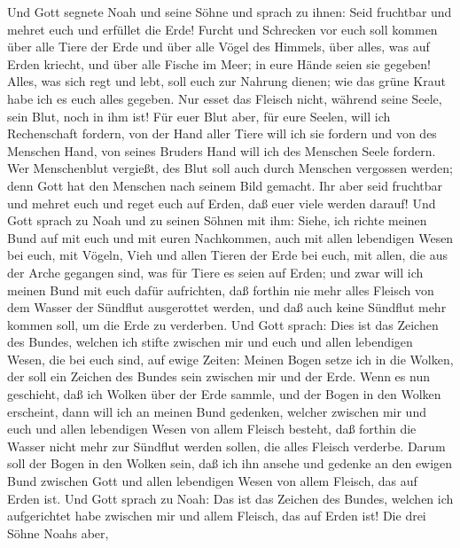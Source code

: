  Und Gott segnete Noah und seine Söhne und sprach zu
ihnen: Seid fruchtbar und mehret euch und erfüllet die Erde!
 Furcht und Schrecken vor euch soll kommen über alle Tiere
der Erde und über alle Vögel des Himmels, über alles, was auf Erden
kriecht, und über alle Fische im Meer; in eure Hände seien sie gegeben!
 Alles, was sich regt und lebt, soll euch zur Nahrung
dienen; wie das grüne Kraut habe ich es euch alles gegeben.
 Nur esset das Fleisch nicht, während seine Seele, sein
Blut, noch in ihm ist!  Für euer Blut aber, für eure
Seelen, will ich Rechenschaft fordern, von der Hand aller Tiere will ich
sie fordern und von des Menschen Hand, von seines Bruders Hand will ich
des Menschen Seele fordern.  Wer Menschenblut vergießt,
des Blut soll auch durch Menschen vergossen werden; denn Gott hat den
Menschen nach seinem Bild gemacht.  Ihr aber seid
fruchtbar und mehret euch und reget euch auf Erden, daß euer viele
werden darauf!  Und Gott sprach zu Noah und zu seinen
Söhnen mit ihm:  Siehe, ich richte meinen Bund auf mit
euch und mit euren Nachkommen,  auch mit allen lebendigen
Wesen bei euch, mit Vögeln, Vieh und allen Tieren der Erde bei euch, mit
allen, die aus der Arche gegangen sind, was für Tiere es seien auf
Erden;  und zwar will ich meinen Bund mit euch dafür
aufrichten, daß forthin nie mehr alles Fleisch von dem Wasser der
Sündflut ausgerottet werden, und daß auch keine Sündflut mehr kommen
soll, um die Erde zu verderben.  Und Gott sprach: Dies
ist das Zeichen des Bundes, welchen ich stifte zwischen mir und euch und
allen lebendigen Wesen, die bei euch sind, auf ewige Zeiten:
 Meinen Bogen setze ich in die Wolken, der soll ein
Zeichen des Bundes sein zwischen mir und der Erde.  Wenn
es nun geschieht, daß ich Wolken über der Erde sammle, und der Bogen in
den Wolken erscheint,  dann will ich an meinen Bund
gedenken, welcher zwischen mir und euch und allen lebendigen Wesen von
allem Fleisch besteht, daß forthin die Wasser nicht mehr zur Sündflut
werden sollen, die alles Fleisch verderbe.  Darum soll
der Bogen in den Wolken sein, daß ich ihn ansehe und gedenke an den
ewigen Bund zwischen Gott und allen lebendigen Wesen von allem Fleisch,
das auf Erden ist.  Und Gott sprach zu Noah: Das ist das
Zeichen des Bundes, welchen ich aufgerichtet habe zwischen mir und allem
Fleisch, das auf Erden ist!  Die drei Söhne Noahs aber,
